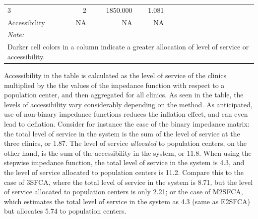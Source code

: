 \documentclass[10pt,letterpaper]{article}
\begin{document}
\begin{landscape}
\begin{table}[t]
\begin{tabular}{lrrrlllllllll}
\hspace{1em}3 & 2 & 1850.000 & 1.081 & \cellcolor[HTML]{FCA636}{\textcolor{black}{0}} & \cellcolor[HTML]{FCA636}{\textcolor{black}{0}} & \cellcolor[HTML]{FCA537}{\textcolor{black}{0.262}} & \cellcolor[HTML]{FCA636}{\textcolor{black}{0.262}} & \cellcolor[HTML]{B7318A}{\textcolor{black}{1.02}} & \cellcolor[HTML]{A72197}{\textcolor{black}{0.649}} & \cellcolor[HTML]{E66C5C}{\textcolor{black}{0.262}} & \cellcolor[HTML]{F2844B}{\textcolor{black}{0.262}} & \cellcolor[HTML]{E66C5C}{\textcolor{black}{0.262}}\\
\hspace{1em}Accessibility & NA & NA & NA & \cellcolor[HTML]{F2844B}{\textcolor{black}{0.0927}} & \cellcolor[HTML]{CF4C74}{\textcolor{black}{0.666}} & \cellcolor[HTML]{DF6263}{\textcolor{black}{0.745}} & \cellcolor[HTML]{B12A90}{\textcolor{black}{1.22}} & \cellcolor[HTML]{7501A8}{\textcolor{black}{1.55}} & \cellcolor[HTML]{C6417D}{\textcolor{black}{0.485}} & \cellcolor[HTML]{F1814D}{\textcolor{black}{0.159}} & \cellcolor[HTML]{D8576B}{\textcolor{black}{0.652}} & \cellcolor[HTML]{F1814D}{\textcolor{black}{0.159}}\\
\bottomrule
\multicolumn{13}{l}{\textit{Note: }}\\
\multicolumn{13}{l}{Darker cell colors in a column indicate a greater allocation of level of service or accessibility. }\\
\end{tabular}
\end{table}
\end{landscape}

Accessibility in the table is calculated as the level of service of the
clinics multiplied by the the values of the impedance function with
respect to a population center, and then aggregated for all clinics. As
seen in the table, the levels of accessibility vary considerably
depending on the method. As anticipated, use of non-binary impedance
functions reduces the inflation effect, and can even lead to deflation.
Consider for instance the case of the binary impedance matrix: the total
level of service in the system is the sum of the level of service at the
three clinics, or 1.87. The level of service \emph{allocated} to
population centers, on the other hand, is the sum of the accessibility
in the system, or 11.8. When using the stepwise impedance function, the
total level of service in the system is 4.3, and the level of service
allocated to population centers is 11.2. Compare this to the case of
3SFCA, where the total level of service in the system is 8.71, but the
level of service allocated to population centers is only 2.21; or the
case of M2SFCA, which estimates the total level of service in the system
as 4.3 (same as E2SFCA) but allocates 5.74 to population centers.
\end{document}
